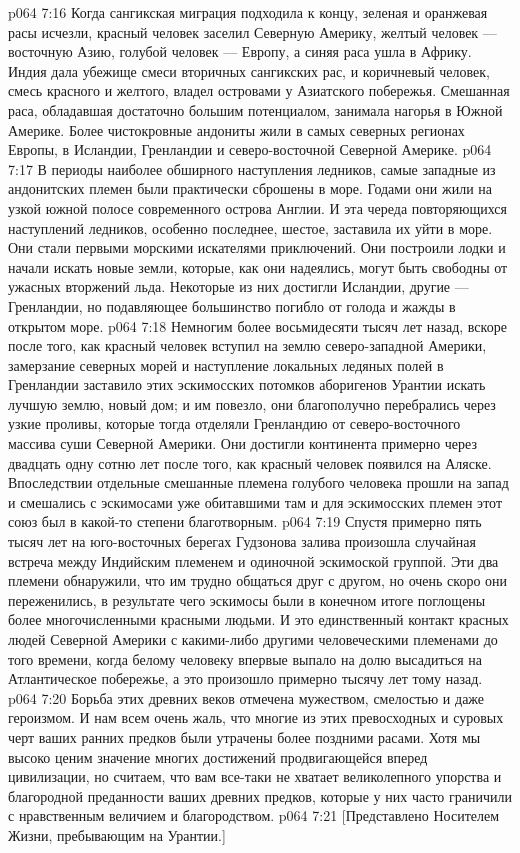\vs p064 7:16 Когда сангикская миграция подходила к концу, зеленая и оранжевая расы исчезли, красный человек заселил Северную Америку, желтый человек --- восточную Азию, голубой человек --- Европу, а синяя раса ушла в Африку. Индия дала убежище смеси вторичных сангикских рас, и коричневый человек, смесь красного и желтого, владел островами у Азиатского побережья. Смешанная раса, обладавшая достаточно большим потенциалом, занимала нагорья в Южной Америке. Более чистокровные андониты жили в самых северных регионах Европы, в Исландии, Гренландии и северо\hyp{}восточной Северной Америке.
\vs p064 7:17 \pc В периоды наиболее обширного наступления ледников, самые западные из андонитских племен были практически сброшены в море. Годами они жили на узкой южной полосе современного острова Англии. И эта череда повторяющихся наступлений ледников, особенно последнее, шестое, заставила их уйти в море. Они стали первыми морскими искателями приключений. Они построили лодки и начали искать новые земли, которые, как они надеялись, могут быть свободны от ужасных вторжений льда. Некоторые из них достигли Исландии, другие --- Гренландии, но подавляющее большинство погибло от голода и жажды в открытом море.
\vs p064 7:18 Немногим более восьмидесяти тысяч лет назад, вскоре после того, как красный человек вступил на землю северо\hyp{}западной Америки, замерзание северных морей и наступление локальных ледяных полей в Гренландии заставило этих эскимосских потомков аборигенов Урантии искать лучшую землю, новый дом; и им повезло, они благополучно перебрались через узкие проливы, которые тогда отделяли Гренландию от северо\hyp{}восточного массива суши Северной Америки. Они достигли континента примерно через двадцать одну сотню лет после того, как красный человек появился на Аляске. Впоследствии отдельные смешанные племена голубого человека прошли на запад и смешались с эскимосами уже обитавшими там и для эскимосских племен этот союз был в какой\hyp{}то степени благотворным.
\vs p064 7:19 Спустя примерно пять тысяч лет на юго\hyp{}восточных берегах Гудзонова залива произошла случайная встреча между Индийским племенем и одиночной эскимоской группой. Эти два племени обнаружили, что им трудно общаться друг с другом, но очень скоро они переженились, в результате чего эскимосы были в конечном итоге поглощены более многочисленными красными людьми. И это единственный контакт красных людей Северной Америки с какими\hyp{}либо другими человеческими племенами до того времени, когда белому человеку впервые выпало на долю высадиться на Атлантическое побережье, а это произошло примерно тысячу лет тому назад.
\vs p064 7:20 \pc Борьба этих древних веков отмечена мужеством, смелостью и даже героизмом. И нам всем очень жаль, что многие из этих превосходных и суровых черт ваших ранних предков были утрачены более поздними расами. Хотя мы высоко ценим значение многих достижений продвигающейся вперед цивилизации, но считаем, что вам все\hyp{}таки не хватает великолепного упорства и благородной преданности ваших древних предков, которые у них часто граничили с нравственным величием и благородством.
\vsetoff
\vs p064 7:21 [Представлено Носителем Жизни, пребывающим на Урантии.]
